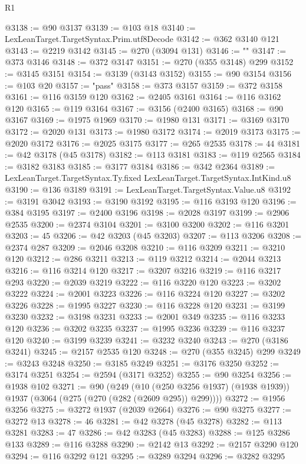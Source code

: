 \begin{lexlean}{R1}
\begin{coremodule}
@3138 := @90 @3137
@3139 := @103 @18
@3140 := LexLeanTarget.TargetSyntax.Prim.utf8Decode
@3142 := @362 @3140 @121
@3143 := @2219 @3142
@3145 := @270 (@3094 @131)
@3146 := ""
@3147 := @373 @3146
@3148 := @372 @3147
@3151 := @270 (@355 @3148) @299
@3152 := @3145 @3151
@3154 := @3139 (@3143 @3152)
@3155 := @90 @3154
@3156 := @103 @20
@3157 := "pass"
@3158 := @373 @3157
@3159 := @372 @3158
@3161 := @116 @3159 @120
@3162 := @2405 @3161
@3164 := @116 @3162 @120
@3165 := @119 @3164
@3167 := @3156 (@2400 @3165)
@3168 := @90 @3167
@3169 := @1975 @1969
@3170 := @1980 @131
@3171 := @3169 @3170
@3172 := @2020 @131
@3173 := @1980 @3172
@3174 := @2019 @3173
@3175 := @2020 @3172
@3176 := @2025 @3175
@3177 := @265 @2535
@3178 := 44
@3181 := @42 @3178 (@45 @3178)
@3182 := @113 @3181
@3183 := @119 @2565
@3184 := @3182 @3183
@3185 := @3177 @3184
@3186 := @342 @2364
@3189 := LexLeanTarget.TargetSyntax.Ty.fixed LexLeanTarget.TargetSyntax.IntKind.u8
@3190 := @136 @3189
@3191 := LexLeanTarget.TargetSyntax.Value.u8
@3192 := @3191 @3042
@3193 := @3190 @3192
@3195 := @116 @3193 @120
@3196 := @384 @3195
@3197 := @2400 @3196
@3198 := @2028 @3197
@3199 := @2906 @2535
@3200 := @2374 @3104
@3201 := @3100 @3200
@3202 := @116 @3201
@3203 := 45
@3206 := @42 @3203 (@45 @3203)
@3207 := @113 @3206
@3208 := @2374 @287
@3209 := @2046 @3208
@3210 := @116 @3209
@3211 := @3210 @120
@3212 := @286 @3211
@3213 := @119 @3212
@3214 := @2044 @3213
@3216 := @116 @3214 @120
@3217 := @3207 @3216
@3219 := @116 @3217 @293
@3220 := @2039 @3219
@3222 := @116 @3220 @120
@3223 := @3202 @3222
@3224 := @2001 @3223
@3226 := @116 @3224 @120
@3227 := @3202 @3226
@3228 := @1995 @3227
@3230 := @116 @3228 @120
@3231 := @3199 @3230
@3232 := @3198 @3231
@3233 := @2001 @349
@3235 := @116 @3233 @120
@3236 := @3202 @3235
@3237 := @1995 @3236
@3239 := @116 @3237 @120
@3240 := @3199 @3239
@3241 := @3232 @3240
@3243 := @270 (@3186 @3241)
@3245 := @2157 @2535 @120
@3248 := @270 (@355 @3245) @299
@3249 := @3243 @3248
@3250 := @3185 @3249
@3251 := @3176 @3250
@3252 := @3174 @3251
@3254 := @2594 (@3171 @3252)
@3255 := @90 @3254
@3256 := @1938 @102
@3271 := @90
    (@249
      (@10 (@250 @3256 @1937) (@1938 @1939))
      @1937
      (@3064 (@275 (@270 (@282 (@2609 @295)) @299))))
@3272 := @1956 @3256
@3275 := @3272 @1937 (@2039 @2664)
@3276 := @90 @3275
@3277 := @3272 @13
@3278 := 46
@3281 := @42 @3278 (@45 @3278)
@3282 := @113 @3281
@3283 := 47
@3286 := @42 @3283 (@45 @3283)
@3288 := @125 @3286 @133
@3289 := @116 @3288
@3290 := @2142 @13
@3292 := @2157 @3290 @120
@3294 := @116 @3292 @121
@3295 := @3289 @3294
@3296 := @3282 @3295

\end{coremodule}
\end{lexlean}
